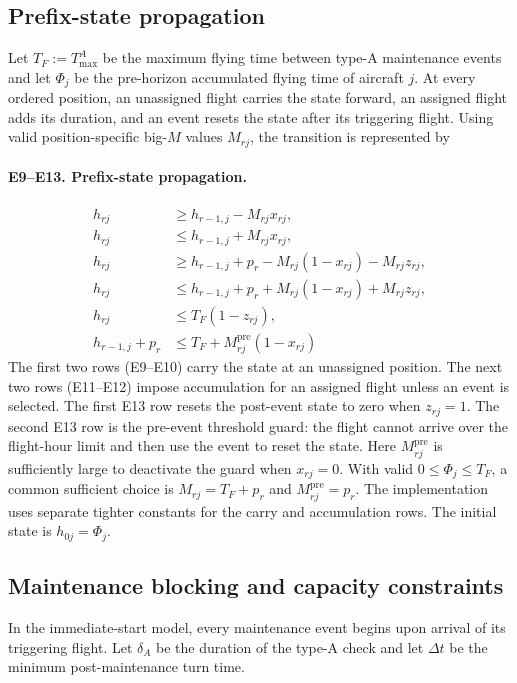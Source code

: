 \subsection{Prefix-state propagation}

Let $T_F:=T^A_{\max}$ be the maximum flying time between type-A maintenance events and let $\Phi_j$
be the pre-horizon accumulated flying time of aircraft $j$. At every ordered
position, an unassigned flight carries the state forward, an assigned flight
adds its duration, and an event resets the state after its triggering flight.
Using valid position-specific big-$M$ values $M_{rj}$, the transition is
represented by
\paragraph{E9--E13. Prefix-state propagation.}
\begin{align}
h_{rj}&\ge h_{r-1,j}-M_{rj}x_{rj},\\
h_{rj}&\le h_{r-1,j}+M_{rj}x_{rj},\\
h_{rj}&\ge h_{r-1,j}+p_{r}-M_{rj}(1-x_{rj})-M_{rj}z_{rj},\\
h_{rj}&\le h_{r-1,j}+p_{r}+M_{rj}(1-x_{rj})+M_{rj}z_{rj},\\
h_{rj}&\le T_F(1-z_{rj}),\\
h_{r-1,j}+p_r&\le T_F+M^{\mathrm{pre}}_{rj}(1-x_{rj})
\label{eq:ordered_hour_transition}
\end{align}
The first two rows (E9--E10) carry the state at an unassigned position. The next two
rows (E11--E12) impose accumulation for an assigned flight unless an event is selected.
The first E13 row resets the post-event state to zero when $z_{rj}=1$. The second
E13 row is the pre-event threshold guard: the flight cannot arrive over the
flight-hour limit and then use the event to reset the state. Here
$M^{\mathrm{pre}}_{rj}$ is sufficiently large to deactivate the guard when
$x_{rj}=0$. With valid $0\le\Phi_j\le T_F$, a common sufficient choice is
$M_{rj}=T_F+p_r$ and $M^{\mathrm{pre}}_{rj}=p_r$. The implementation uses
separate tighter constants for the carry and accumulation rows.
The initial state is $h_{0j}=\Phi_j$.

\subsection{Maintenance blocking and capacity constraints}

In the immediate-start model, every maintenance event begins upon arrival of
its triggering flight. Let $\delta_A$ be the duration of the type-A check and
let $\Delta t$ be the minimum post-maintenance turn time.

